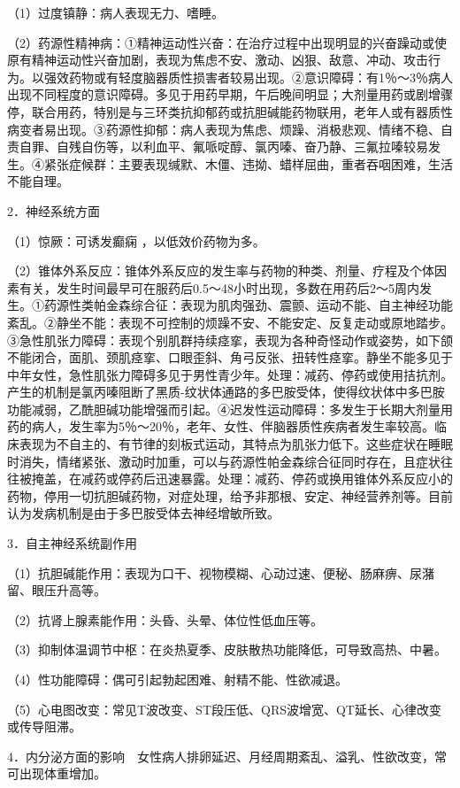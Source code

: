 （1）过度镇静：病人表现无力、嗜睡。

（2）药源性精神病：①精神运动性兴奋：在治疗过程中出现明显的兴奋躁动或使原有精神运动性兴奋加剧，表现为焦虑不安、激动、凶狠、敌意、冲动、攻击行为。以强效药物或有轻度脑器质性损害者较易出现。②意识障碍：有1％～3％病人出现不同程度的意识障碍。多见于用药早期，午后晚间明显；大剂量用药或剧增骤停，联合用药，特别是与三环类抗抑郁药或抗胆碱能药物联用，老年人或有器质性病变者易出现。③药源性抑郁：病人表现为焦虑、烦躁、消极悲观、情绪不稳、自责自罪、自残自伤等，以利血平、氟哌啶醇、氯丙嗪、奋乃静、三氟拉嗪较易发生。④紧张症候群：主要表现缄默、木僵、违拗、蜡样屈曲，重者吞咽困难，生活不能自理。

2．神经系统方面

（1）惊厥：可诱发癫痫
，以低效价药物为多。

（2）锥体外系反应：锥体外系反应的发生率与药物的种类、剂量、疗程及个体因素有关，发生时间最早可在服药后0.5～48小时出现，多数在用药后2～5周内发生。①药源性类帕金森综合征：表现为肌肉强劲、震颤、运动不能、自主神经功能紊乱。②静坐不能：表现不可控制的烦躁不安、不能安定、反复走动或原地踏步。③急性肌张力障碍：表现个别肌群持续痉挛，表现为各种奇怪动作或姿势，如下颌不能闭合，面肌、颈肌痉挛、口眼歪斜、角弓反张、扭转性痉挛。静坐不能多见于中年女性，急性肌张力障碍多见于男性青少年。处理：减药、停药或使用拮抗剂。产生的机制是氯丙嗪阻断了黑质-纹状体通路的多巴胺受体，使得纹状体中多巴胺功能减弱，乙酰胆碱功能增强而引起。④迟发性运动障碍：多发生于长期大剂量用药的病人，发生率为5％～20％，老年、女性、伴脑器质性疾病者发生率较高。临床表现为不自主的、有节律的刻板式运动，其特点为肌张力低下。这些症状在睡眠时消失，情绪紧张、激动时加重，可以与药源性帕金森综合征同时存在，且症状往往被掩盖，在减药或停药后迅速暴露。处理：减药、停药或换用锥体外系反应小的药物，停用一切抗胆碱药物，对症处理，给予非那根、安定、神经营养剂等。目前认为发病机制是由于多巴胺受体去神经增敏所致。

3．自主神经系统副作用

（1）抗胆碱能作用：表现为口干、视物模糊、心动过速、便秘、肠麻痹、尿潴留、眼压升高等。

（2）抗肾上腺素能作用：头昏、头晕、体位性低血压等。

（3）抑制体温调节中枢：在炎热夏季、皮肤散热功能降低，可导致高热、中暑。

（4）性功能障碍：偶可引起勃起困难、射精不能、性欲减退。

（5）心电图改变：常见T波改变、ST段压低、QRS波增宽、QT延长、心律改变或传导阻滞。

4．内分泌方面的影响　女性病人排卵延迟、月经周期紊乱、溢乳、性欲改变，常可出现体重增加。

